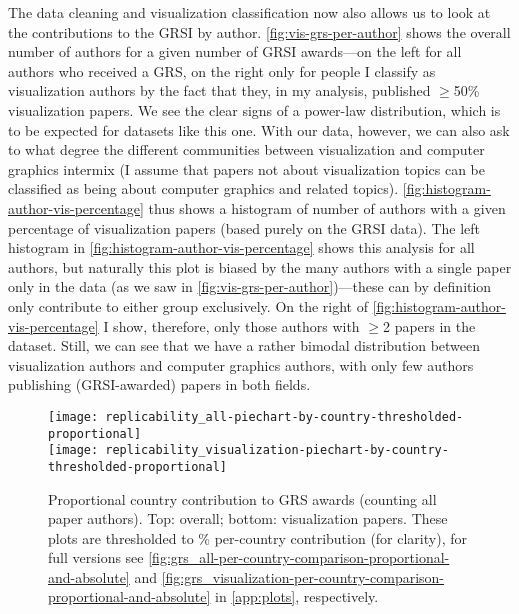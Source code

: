\documentclass[conference,svgnames]{vgtc}                     %
\begin{document}
The data cleaning and visualization classification now also allows us to look at the contributions to the GRSI by author. \autoref{fig:vis-grs-per-author} shows the overall number of authors for a given number of GRSI awards---on the left for all authors who received a GRS, on the right only for people I classify as visualization authors by the fact that they, in my analysis, published $\geq$50\% visualization papers. We see the clear signs of a power-law distribution, which is to be expected for datasets like this one. With our data, however, we can also ask to what degree the different communities between visualization and computer graphics intermix (I assume that papers not about visualization topics can be classified as being about computer graphics and related topics). \autoref{fig:histogram-author-vis-percentage} thus shows a histogram of number of authors with a given percentage of visualization papers (based purely on the GRSI data). The left histogram in \autoref{fig:histogram-author-vis-percentage} shows this analysis for all authors, but naturally this plot is biased by the many authors with a single paper only in the data (as we saw in \autoref{fig:vis-grs-per-author})---these can by definition only contribute to either group exclusively. On the right of \autoref{fig:histogram-author-vis-percentage} I show, therefore, only those authors with $\geq$2 papers in the dataset. Still, we can see that we have a rather bimodal distribution between visualization authors and computer graphics authors, with only few authors publishing (GRSI-awarded) papers in both fields.

\begin{figure}
	\centering
	\texttt{[image: replicability\_all-piechart-by-country-thresholded-proportional]}\\[1ex]%
	\texttt{[image: replicability\_visualization-piechart-by-country-thresholded-proportional]}%
	\caption{Proportional country contribution to GRS awards (counting all paper authors). Top: overall; bottom: visualization papers. These plots are thresholded to \GrsiCountryPieChartThreshold\% per-country contribution (for clarity), for full versions see \autoref{fig:grs_all-per-country-comparison-proportional-and-absolute} and \autoref{fig:grs_visualization-per-country-comparison-proportional-and-absolute} in \autoref{app:plots}, respectively.}
	\label{fig:vis-grs-per-country-proportional}
\end{figure}
\end{document}
